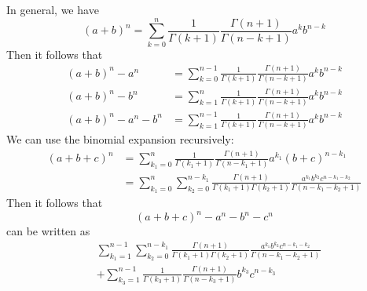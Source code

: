 In general, we have
\begin{equation}
	(a + b)^{n} = \sum_{k = 0}^{n} \frac{1}{\Gamma(k + 1)} \frac{\Gamma(n + 1)}{\Gamma(n - k + 1)} a^{k} b^{n - k}
\end{equation}
Then it follows that
\begin{align}
	(a + b)^{n} - a^{n} &= \sum_{k = 0}^{n - 1} \frac{1}{\Gamma(k + 1)} \frac{\Gamma(n + 1)}{\Gamma(n - k + 1)} a^{k} b^{n - k} \\
	(a + b)^{n} - b^{n} &= \sum_{k = 1}^{n} \frac{1}{\Gamma(k + 1)} \frac{\Gamma(n + 1)}{\Gamma(n - k + 1)} a^{k} b^{n - k} \\
	(a + b)^{n} - a^{n} - b^{n} &= \sum_{k = 1}^{n - 1} \frac{1}{\Gamma(k + 1)} \frac{\Gamma(n + 1)}{\Gamma(n - k + 1)} a^{k} b^{n - k}
\end{align}
We can use the binomial expansion recursively:
\begin{align}
	(a + b + c)^{n} &= \sum_{k_{1} = 0}^{n} \frac{1}{\Gamma(k_{1} + 1)} \frac{\Gamma(n + 1)}{\Gamma(n - k_{1} + 1)} a^{k_{1}} (b + c)^{n - k_{1}} \nonumber \\
	&= \sum_{k_{1} = 0}^{n} \sum_{k_{2} = 0}^{n - k_{1}} \frac{\Gamma(n + 1)}{\Gamma(k_{1} + 1) \Gamma(k_{2} + 1)} \frac{a^{k_{1}} b^{k_{2}} c^{n - k_{1} - k_{2}}}{\Gamma(n - k_{1} - k_{2} + 1)}
\end{align}
Then it follows that
\begin{equation}
	(a + b + c)^{n} - a^{n} - b^{n} - c^{n}
\end{equation}
can be written as
\begin{equation}
\begin{split}
	{}& \sum_{k_{1} = 1}^{n - 1} \sum_{k_{2} = 0}^{n - k_{1}} \frac{\Gamma(n + 1)}{\Gamma(k_{1} + 1) \Gamma(k_{2} + 1)} \frac{a^{k_{1}} b^{k_{2}} c^{n - k_{1} - k_{2}}}{\Gamma(n - k_{1} - k_{2} + 1)} \\
	&+ \sum_{k_{3} = 1}^{n - 1} \frac{1}{\Gamma(k_{3} + 1)} \frac{\Gamma(n + 1)}{\Gamma(n - k_{3} + 1)} b^{k_{3}} c^{n - k_{3}}
\end{split}
\end{equation}